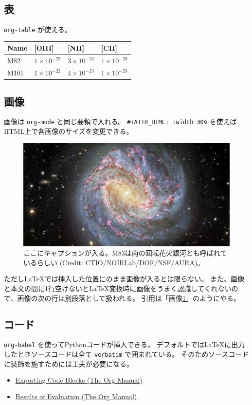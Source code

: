 \documentclass[a4paper, 10pt, notitlepage, uplatex, dvipdfmx]{jsarticle}
\begin{document}
\subsection{表}
\label{sec:org8506923}
\texttt{org-table} が使える。

\begin{center}
\begin{tabular}{llll}
\hline
\hline
Name & {[}OIII] & {[}NII] & {[}CII]\\
\hline
M82 & \(1\times10^{-22}\) & \(3\times10^{-23}\) & \(1\times10^{-23}\)\\
M101 & \(1\times10^{-22}\) & \(4\times10^{-23}\) & \(1\times10^{-23}\)\\
\hline
\end{tabular}
\end{center}
\subsection{画像}
\label{sec:orgd09cd2a}
画像は \texttt{org-mode} と同じ要領で入れる。
\texttt{\#+ATTR\_HTML: :width 30\%} を使えばHTML上で各画像のサイズを変更できる。

\begin{figure}[htbp]
\centering
\includegraphics[width=.9\linewidth]{m83.jpg}
\caption{\label{fig:m83}ここにキャプションが入る。M83は南の回転花火銀河とも呼ばれているらしい (Credit: CTIO/NOIRLab/DOE/NSF/AURA)。}
\end{figure}

ただし\LaTeX{}では挿入した位置にのまま画像が入るとは限らない。
また、画像と本文の間に1行空けないと\LaTeX{}変換時に画像をうまく認識してくれないので、画像の次の行は別段落として扱われる。
引用は「画像\ref{fig:m83}」のようにやる。
\subsection{コード}
\label{sec:org32843ee}
\texttt{org-babel} を使ってPythonコードが挿入できる。
デフォルトでは\LaTeX{}に出力したときソースコードは全て \texttt{verbatim} で囲まれている。
そのためソースコードに装飾を施すためには工夫が必要になる。
\begin{itemize}
\item \href{https://orgmode.org/manual/Exporting-Code-Blocks.html}{Exporting Code Blocks (The Org Manual)}
\item \href{https://orgmode.org/manual/Results-of-Evaluation.html}{Results of Evaluation (The Org Manual)}
\end{itemize}
\end{document}
